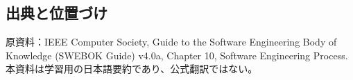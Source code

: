 \subsection*{出典と位置づけ}
原資料：IEEE Computer Society, Guide to the Software Engineering Body of Knowledge (SWEBOK Guide) v4.0a, Chapter 10, Software Engineering Process. 本資料は学習用の日本語要約であり、公式翻訳ではない。
